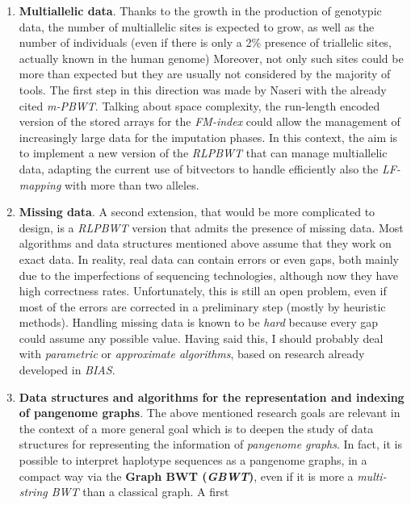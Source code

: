 \documentclass[a4paper,11pt, oneside]{article}
\newcommand{\pb}[1]{\todo[backgroundcolor=red]{\textbf{PB} #1}}
\begin{document}
\begin{enumerate}[leftmargin=.2in]
  \setlength\itemsep{-0.2em}
  \item \textbf{Multiallelic data}. Thanks to the growth in the
  production of genotypic data, the number of multiallelic sites is expected to
  grow, as well as the number of individuals (even if there is only a 2\%
  presence of triallelic sites, actually known in the human genome)
  Moreover, not only 
  such sites could be more than expected but they are 
  usually not considered by the majority of tools. The first step in this
  direction was made 
  by Naseri with the already cited \textit{m-PBWT}.
  Talking about space complexity, the run-length encoded version of the stored
  arrays for the \textit{FM-index} could allow the management of increasingly
  large data for the imputation phases.   
  In this context, the aim is to implement a new 
  version of the \textit{RLPBWT} that can manage multiallelic data, adapting the
  current use of bitvectors to handle efficiently also the \textit{LF-mapping}
  with more than two alleles. 
  \item \textbf{Missing data}. A second extension, that would be more
  complicated to 
  design, is a \textit{RLPBWT} version that admits the presence of
  missing data. Most algorithms and data structures mentioned above assume that
  they work on exact data. In reality, real data can contain errors or even
  gaps, both mainly due to the imperfections of sequencing technologies,
  although now they have high correctness rates. Unfortunately, this is
  still an open problem, even if most of the errors are corrected in a
  preliminary step (mostly by heuristic methods).
  Handling missing data is known to be \textit{hard} because every gap could
  assume any possible value. Having said this, I should  
  probably deal with \textit{parametric} or \textit{approximate algorithms},
  based on research already developed in \textit{BIAS}.
  \item \textbf{Data structures and algorithms for the representation and
    indexing  of pangenome graphs}. The above mentioned  research 
  goals are relevant in the context of a more general goal which is to deepen 
  the study of data structures for  representing the information of
  \textit{pangenome graphs}. In fact, it is possible to interpret 
  haplotype sequences as a 
  pangenome graphs, in a compact way via the \textbf{Graph BWT (\textit{GBWT})},
  even if it is more a \textit{multi-string BWT} than a classical graph. A first

\end{enumerate}
\end{document}
